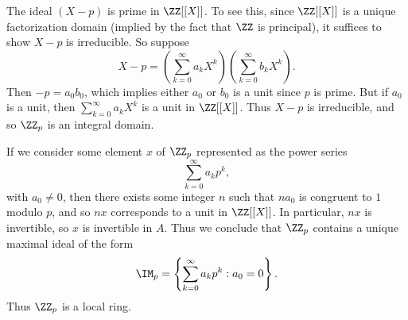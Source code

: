 \begin{example}
    The ideal $(X - p)$ is prime in $\ZZ[[X]]$. To see this, since $\ZZ[[X]]$ is a unique factorization domain (implied by the fact that $\ZZ$ is principal), it suffices to show $X - p$ is irreducible. So suppose
    \[ X - p = \left( \sum_{k = 0}^\infty a_k X^k \right) \left( \sum_{k = 0}^\infty b_k X^k \right). \]
    Then $-p = a_0b_0$, which implies either $a_0$ or $b_0$ is a unit since $p$ is prime. But if $a_0$ is a unit, then $\sum_{k = 0}^\infty a_k X^k$ is a unit in $\ZZ[[X]]$. Thus $X - p$ is irreducible, and so $\ZZ_p$ is an integral domain.

    If we consider some element $x$ of $\ZZ_p$ represented as the power series
    \[ \sum_{k = 0}^\infty a_k p^k, \]
    with $a_0 \neq 0$, then there exists some integer $n$ such that $na_0$ is congruent to $1$ modulo $p$, and so $nx$ corresponds to a unit in $\ZZ[[X]]$. In particular, $nx$ is invertible, so $x$ is invertible in $A$. Thus we conclude that $\ZZ_p$ contains a unique maximal ideal of the form
    \[ \IM_p = \left\{ \sum_{k = 0}^\infty a_k p^k : a_0 = 0 \right\}. \]
    Thus $\ZZ_p$ is a local ring.


\end{example}
